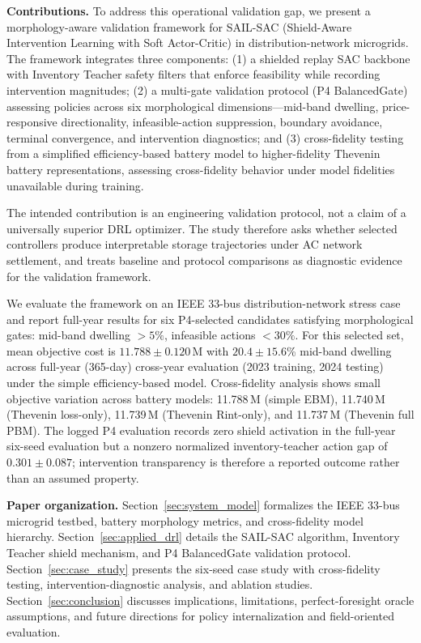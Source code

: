 \textbf{Contributions.} To address this operational validation gap, we present a morphology-aware validation framework for SAIL-SAC (Shield-Aware Intervention Learning with Soft Actor-Critic) in distribution-network microgrids. The framework integrates three components: (1) a shielded replay SAC backbone with Inventory Teacher safety filters that enforce feasibility while recording intervention magnitudes; (2) a multi-gate validation protocol (P4 BalancedGate) assessing policies across six morphological dimensions---mid-band dwelling, price-responsive directionality, infeasible-action suppression, boundary avoidance, terminal convergence, and intervention diagnostics; and (3) cross-fidelity testing from a simplified efficiency-based battery model to higher-fidelity Thevenin battery representations, assessing cross-fidelity behavior under model fidelities unavailable during training.

The intended contribution is an engineering validation protocol, not a claim of a universally superior DRL optimizer. The study therefore asks whether selected controllers produce interpretable storage trajectories under AC network settlement, and treats baseline and protocol comparisons as diagnostic evidence for the validation framework.

We evaluate the framework on an IEEE 33-bus distribution-network stress case and report full-year results for six P4-selected candidates satisfying morphological gates: mid-band dwelling $>5\%$, infeasible actions $<30\%$. For this selected set, mean objective cost is $11.788 \pm 0.120$\,M\textyen{} with $20.4 \pm 15.6$\% mid-band dwelling across full-year (365-day) cross-year evaluation (2023 training, 2024 testing) under the simple efficiency-based model. Cross-fidelity analysis shows small objective variation across battery models: 11.788\,M\textyen{} (simple EBM), 11.740\,M\textyen{} (Thevenin loss-only), 11.739\,M\textyen{} (Thevenin Rint-only), and 11.737\,M\textyen{} (Thevenin full PBM). The logged P4 evaluation records zero shield activation in the full-year six-seed evaluation but a nonzero normalized inventory-teacher action gap of $0.301 \pm 0.087$; intervention transparency is therefore a reported outcome rather than an assumed property.

\textbf{Paper organization.} Section~\ref{sec:system_model} formalizes the IEEE 33-bus microgrid testbed, battery morphology metrics, and cross-fidelity model hierarchy. Section~\ref{sec:applied_drl} details the SAIL-SAC algorithm, Inventory Teacher shield mechanism, and P4 BalancedGate validation protocol. Section~\ref{sec:case_study} presents the six-seed case study with cross-fidelity testing, intervention-diagnostic analysis, and ablation studies. Section~\ref{sec:conclusion} discusses implications, limitations, perfect-foresight oracle assumptions, and future directions for policy internalization and field-oriented evaluation.
